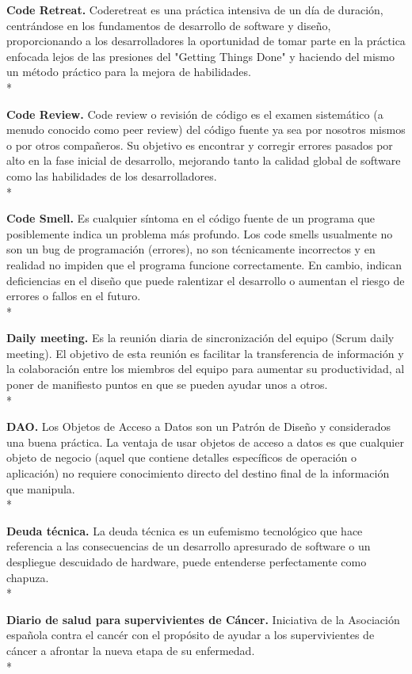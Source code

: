 \documentclass[../pfc.tex]{subfiles}
\begin{document}
	\textbf{Code Retreat.}
	Coderetreat es una práctica intensiva de un día de duración, centrándose en los fundamentos de desarrollo de software y diseño, proporcionando a los desarrolladores la oportunidad de tomar parte en la práctica enfocada lejos de las presiones del "Getting Things Done" y haciendo del mismo un método práctico para la mejora de habilidades.\\*
	
	\textbf{Code Review.}
	Code review o revisión de código es el examen sistemático (a menudo conocido como peer review) del código fuente ya sea por nosotros mismos o por otros compañeros.
	Su objetivo es encontrar y corregir errores pasados por alto en la fase inicial de desarrollo, mejorando tanto la calidad global de software como las habilidades de los desarrolladores.\\*
	
	\textbf{Code Smell.}
	Es cualquier síntoma en el código fuente de un programa que posiblemente indica un problema más profundo. Los code smells usualmente no son un bug de programación (errores), no son técnicamente incorrectos y en realidad no impiden que el programa funcione correctamente. En cambio, indican deficiencias en el diseño que puede ralentizar el desarrollo o aumentan el riesgo de errores o fallos en el futuro.\\*
	
	\textbf{Daily meeting.}
	Es la reunión diaria de sincronización del equipo (Scrum daily meeting).
	El objetivo de esta reunión es facilitar la transferencia de información y la colaboración entre los miembros del equipo para aumentar su productividad, al poner de manifiesto puntos en que se pueden ayudar unos a otros.\\*
	
	\textbf{DAO.}
	Los Objetos de Acceso a Datos son un Patrón de Diseño y considerados una buena práctica.
	La ventaja de usar objetos de acceso a datos es que cualquier objeto de negocio (aquel que contiene detalles específicos de operación o aplicación) no requiere conocimiento directo del destino final de la información que manipula.\\*
	
	\textbf{Deuda técnica.}
	La deuda técnica es un eufemismo tecnológico que hace referencia a las consecuencias de un desarrollo apresurado de software o un despliegue descuidado de hardware, puede entenderse perfectamente como chapuza.\\* 
	
	\textbf{Diario de salud para supervivientes de Cáncer.}
	Iniciativa de la Asociación española contra el cancér con el propósito de ayudar a los supervivientes de cáncer a afrontar la nueva etapa de su enfermedad.\\*
	
\end{document}
